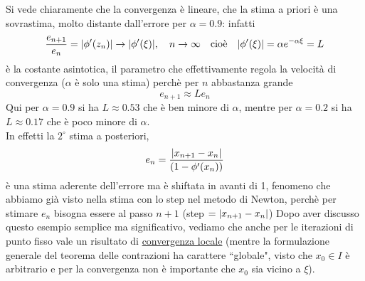 \documentclass[12pt]{article}
\DeclarePairedDelimiter{\abs}{\lvert}{\rvert}
\begin{document}
Si vede chiaramente che la convergenza è lineare, che la stima a priori è una sovrastima, molto distante dall'errore per $\alpha = 0.9$: infatti
\[\frac{e_{n+1}}{e_n} = \abs{\phi'(z_n)} \to \abs{\phi'(\xi)}, \quad n \to \infty \quad \text{cioè} \quad \abs{\phi'(\xi)} = \alpha e^{-\alpha \xi} = L\]
è la costante asintotica, il parametro che effettivamente regola la velocità di convergenza ($\alpha$ è solo una stima) perchè per $n$ abbastanza grande
\[e_{n+1} \approx Le_n\]
Qui per $\alpha=0.9$ si ha $L \approx 0.53$ che è ben minore di $\alpha$, mentre per $\alpha=0.2$ si ha $L \approx 0.17$ che è poco minore di $\alpha$.\\
In effetti la $2^\circ$ stima a posteriori,
\[e_n = \frac{\abs{x_{n+1} - x_n}}{(1 - \phi'(x_n))}\]
è una stima aderente dell'errore ma è shiftata in avanti di 1, fenomeno che abbiamo già visto nella stima con lo step nel metodo di Newton, perchè per stimare $e_n$ bisogna essere al passo $n+1$ (step $=\abs{x_{n+1}-x_n}$)
\newline \newline
Dopo aver discusso questo esempio semplice ma significativo, vediamo che anche per le iterazioni di punto fisso vale un risultato di \uline{convergenza locale} (mentre la formulazione generale del teorema delle contrazioni ha
carattere ``globale", visto che $x_0 \in I$ è arbitrario e per la convergenza non è importante che $x_0$ sia vicino a $\xi$).
\end{document}
